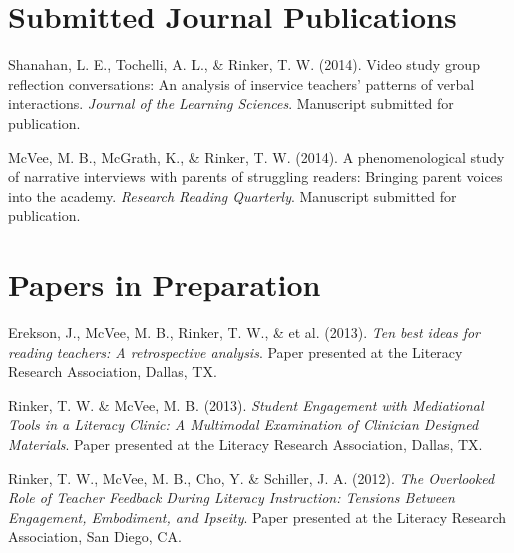 

\section{Submitted Journal Publications}
\vspace{-.1275in}
\begin{bibsection}
    \item Shanahan, L. E., Tochelli, A. L., \& Rinker, T. W. (2014). Video study group reflection conversations: An analysis of inservice teachers' patterns of verbal interactions. \emph{Journal of the Learning Sciences}. Manuscript submitted for publication.
    
    \item McVee, M. B., McGrath, K., \& Rinker, T. W. (2014). A phenomenological study of narrative interviews with parents of struggling readers: Bringing parent voices into the academy. \emph{Research Reading Quarterly}. Manuscript submitted for publication.
\end{bibsection}


\halfblankline

\section{Papers in Preparation}
\vspace{-.1in}
\begin{bibsection}

\item Erekson, J., McVee, M. B., Rinker, T. W., \& et al. (2013). \emph{Ten best ideas for reading teachers: A retrospective analysis}. Paper presented at the Literacy Research Association, Dallas, TX.

\item Rinker, T. W. \& McVee, M. B. (2013).  \emph{Student Engagement with Mediational Tools in a Literacy Clinic: A Multimodal Examination of Clinician Designed Materials}.  Paper presented at the Literacy Research Association, Dallas, TX.

\item Rinker, T. W., McVee, M. B., Cho, Y. \& Schiller, J. A. (2012).  \emph{The Overlooked Role of Teacher Feedback During Literacy Instruction: Tensions Between Engagement, Embodiment, and Ipseity}.  Paper presented at the Literacy Research Association, San Diego, CA.



\end{bibsection}

